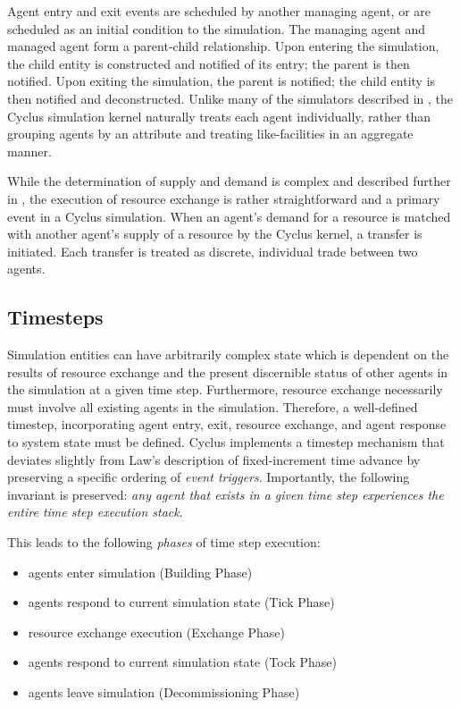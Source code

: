 Agent entry and exit events are scheduled by another managing agent, or are
scheduled as an initial condition to the simulation. The managing agent and
managed agent form a parent-child relationship. Upon entering the simulation,
the child entity is constructed and notified of its entry; the parent is then
notified. Upon exiting the simulation, the parent is notified; the child entity
is then notified and deconstructed. Unlike many of the simulators described in
, the Cyclus simulation kernel naturally treats each agent
individually, rather than grouping agents by an attribute and treating
like-facilities in an aggregate manner.

While the determination of supply and demand is complex and described further in
, the execution of resource exchange is rather straightforward
and a primary event in a Cyclus simulation. When an agent's demand for a
resource is matched with another agent's supply of a resource by the Cyclus
kernel, a transfer is initiated. Each transfer is treated as discrete,
individual trade between two agents.

\subsection{Timesteps}

Simulation entities can have arbitrarily complex state which is dependent on the
results of resource exchange and the present discernible status of other agents
in the simulation at a given time step. Furthermore, resource exchange
necessarily must involve all existing agents in the simulation. Therefore, a
well-defined timestep, incorporating agent entry, exit, resource exchange, and
agent response to system state must be defined. Cyclus implements a timestep
mechanism that deviates slightly from Law's description of fixed-increment time
advance by preserving a specific ordering of \textit{event
  triggers}. Importantly, the following invariant is preserved: \textit{any
  agent that exists in a given time step experiences the entire time step
  execution stack}.

This leads to the following \textit{phases} of time step execution:

\begin{itemize}
\item agents enter simulation (Building Phase)
\item agents respond to current simulation state (Tick Phase)
\item resource exchange execution (Exchange Phase)
\item agents respond to current simulation state (Tock Phase)
\item agents leave simulation (Decommissioning Phase)
\end{itemize}

